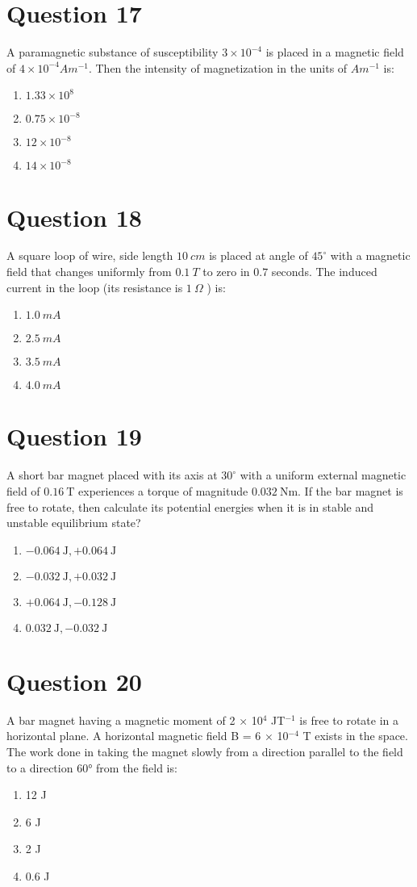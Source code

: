 \documentclass{article}
\begin{document}
\section*{Question 17}
A paramagnetic substance of susceptibility \(3 \times 10^{-4}\) is placed in a magnetic field of \(4 \times 10^{-4} Am ^{-1}\). Then the intensity of magnetization in the units of \(A m^{-1}\) is:
\begin{enumerate}[label=(\alph*)]
\item \(1.33 \times 10^8\)
\item \(0.75 \times 10^{-8}\)
\item \(12 \times 10^{-8}\)
\item \(14 \times 10^{-8}\)
\end{enumerate}
\newpage
\section*{Question 18}
A square loop of wire, side length \(10~ cm\) is placed at angle of \(45^{\circ}\) with a magnetic field that changes uniformly from \(0.1 ~T\) to zero in \(0.7\) seconds. The induced current in the loop (its resistance is \(1 ~\Omega\) ) is:
\begin{enumerate}[label=(\alph*)]
\item \(1.0 ~mA\)
\item \(2.5~ mA\)
\item \(3.5~ mA\)
\item \(4. 0 ~mA\)
\end{enumerate}
\newpage
\section*{Question 19}
A short bar magnet placed with its axis at \(30^{\circ}\) with a uniform external magnetic field of \(0.16 \mathrm{~T}\) experiences a torque of magnitude \(0.032 \mathrm{~Nm}\). If the bar magnet is free to rotate, then calculate its potential energies when it is in stable and unstable equilibrium state?
\begin{enumerate}[label=(\alph*)]
\item \(-0.064 \mathrm{~J},+0.064 \mathrm{~J}\)
\item \(-0.032 \mathrm{~J},+0.032 \mathrm{~J}\)
\item \(+0.064 \mathrm{~J},-0.128 \mathrm{~J}\)
\item \(0.032 \mathrm{~J},-0.032 \mathrm{~J}\)
\end{enumerate}
\newpage
\section*{Question 20}
A bar magnet having a magnetic moment of 2 × 10$^{4}$ JT$^{-1}$ is free to rotate in a horizontal plane. A horizontal magnetic field B = 6 × 10$^{-4}$ T exists in the space. The work done in taking the magnet slowly from a direction parallel to the field to a direction 60° from the field is:
\begin{enumerate}[label=(\alph*)]
\item 12 J
\item 6 J
\item 2 J
\item 0.6 J
\end{enumerate}
\newpage
\end{document}

